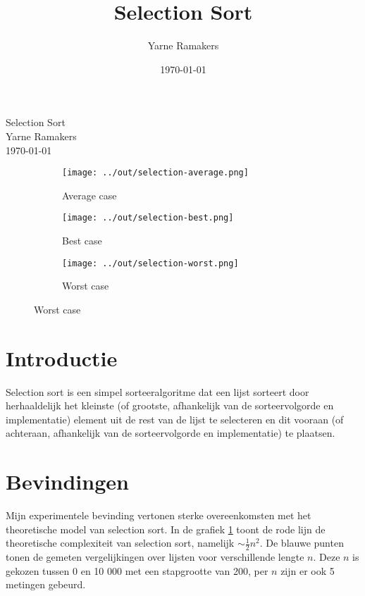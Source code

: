 \documentclass[a4paper]{article}
\title{Selection Sort}
\author{Yarne Ramakers}
\date{\today}
\begin{document}
\begin{center}
  Selection Sort \\
  Yarne Ramakers \\
  \today \\
\end{center}

\begin{figure}[h]
  \begin{subfigure}{0.3\textwidth}
    \texttt{[image: ../out/selection-average.png]}
    \caption{Average case}
    \label{fig:selection-avg}
  \end{subfigure}
  \begin{subfigure}[b]{0.3\textwidth}
    \texttt{[image: ../out/selection-best.png]}
    \caption{Best case}
    \label{fig:selection-best}
  \end{subfigure}
  \begin{subfigure}[b]{0.3\textwidth}
    \texttt{[image: ../out/selection-worst.png]}
    \caption{Worst case}
    \label{fig:selection-worst}
  \end{subfigure}
\end{figure}

\section{Introductie}

Selection sort is een simpel sorteeralgoritme dat een lijst sorteert door herhaaldelijk het kleinste (of grootste, afhankelijk van de sorteervolgorde en implementatie) element uit de rest van de lijst te selecteren en dit vooraan (of achteraan, afhankelijk van de sorteervolgorde en implementatie) te plaatsen.

\section{Bevindingen}
Mijn experimentele bevinding vertonen sterke overeenkomsten met het theoretische model van selection sort.
In de grafiek \ref{fig:selection-avg} toont de rode lijn de theoretische complexiteit van selection sort, namelijk $\sim \frac{1}{2} n^2$. 
De blauwe punten tonen de gemeten vergelijkingen over lijsten voor verschillende lengte $n$. 
Deze $n$ is gekozen tussen 0 en 10 000 met een stapgrootte van 200, per $n$ zijn er ook 5 metingen gebeurd.
\end{document}
